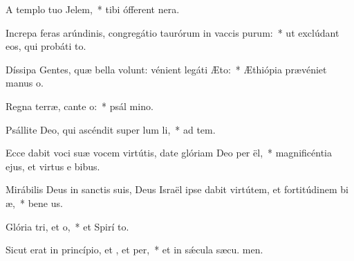\item A templo tuo  Jelem,~* tibi ófferent  nera.
\item Increpa feras arúndinis, congregátio taurórum in vaccis purum:~* ut exclúdant eos, qui probáti  to.
\item Díssipa Gentes, quæ bella volunt: vénient legáti  Æto:~* Æthiópia prævéniet manus  o.
\item Regna terræ, cante o:~* psál mino.
\item Psállite Deo, qui ascéndit super lum li,~* ad tem.
\item Ecce dabit voci suæ vocem virtútis, date glóriam Deo per ël,~* magnificéntia ejus, et virtus e  bibus.
\item Mirábilis Deus in sanctis suis, Deus Israël ipse dabit virtútem, et fortitúdinem bi æ,~* bene us.
\item Glória tri, et o,~* et Spirí to.
\item Sicut erat in princípio, et , et per,~* et in sǽcula sæcu. men.
